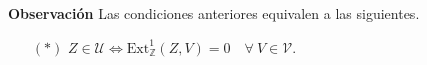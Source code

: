 \documentclass[preview]{standalone}
\begin{document}
\begin{center}
\justifying \textbf{Observación} Las condiciones anteriores equivalen a las siguientes.\begin{itemize} \item[$(\ast)$] $Z\in\mathcal{U} \Leftrightarrow \text{Ext}^1_\mathbb{Z}(Z,V)=0 \quad \forall \ V\in\mathcal{V}.$ \end{itemize}
\end{center}
\end{document}
